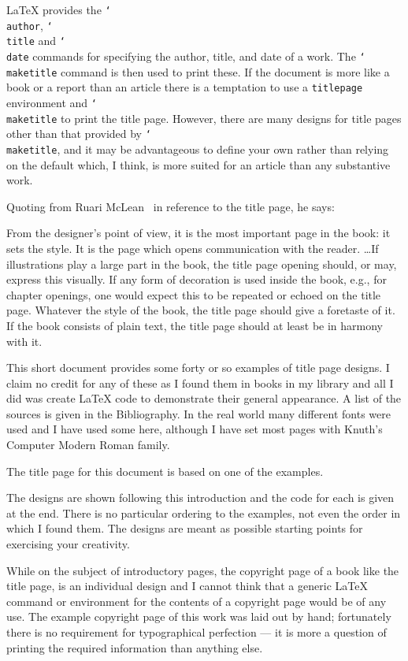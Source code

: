 \documentclass{memoir}
\DeclareRobustCommand{\cs}[1]{\texttt{\char`\\#1}}
\begin{document}
\LaTeX{} provides the \cs{author}, \cs{title} and \cs{date} commands
for specifying the author, title, and date of a work. The \cs{maketitle}
command is then used to print these. If the document is more like a book
or a report than an article there is a temptation to use a \texttt{titlepage}
environment and \cs{maketitle} to print the title page. However, there are
many designs for title pages other than that provided by \cs{maketitle}, and
it may be advantageous to define your own rather than relying on the default
which, I think, is more suited for an article than any substantive work.

Quoting from Ruari McLean~\cite{MCLEAN80} in reference to the title page, he says:
\begin{fancyquotes}
  From the designer's point of view, it is the most important page in the book:
  it sets the style. It is the page which opens communication with the reader.
  \ldots If illustrations play a large part in the book, the title page opening
  should, or may, express this visually. If any form of decoration is used inside
  the book, e.g., for chapter openings, one would expect this to be repeated
  or echoed on the title page. Whatever the style of the book, the title page
  should give a foretaste of it. If the book consists of plain text, the title
  page should at least be in harmony with it.
\end{fancyquotes}

This short document provides some forty or so examples of title page designs.
I claim no credit for any of these as I found them in books in my
library and all I did was create \LaTeX{} code to demonstrate their
general appearance. A list of the sources is given in the Bibliography.
In the real world many different fonts were used
and I have used some here, although I have set most pages with
Knuth's Computer Modern Roman family.

The title page for this document is based on one of the examples.

The designs are shown following this introduction and the code for
each is
given at the end. There is no particular ordering to the examples, not
even the order in which I found them. The designs are meant as possible
starting points for exercising your creativity.

While on the subject of introductory pages, the copyright page of a book
like the title page, is an individual
design and I cannot think that a generic \LaTeX{} command or environment
for the contents of a copyright page would be of any use. The example
copyright page of this work was laid out by hand; fortunately there is
no requirement for typographical perfection --- it is more a question of
printing the required information than anything else.
\end{document}
